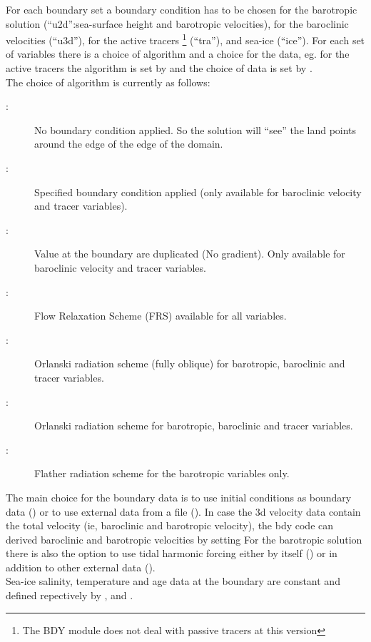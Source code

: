 \documentclass[../main/NEMO_manual]{subfiles}
\begin{document}
For each boundary set a boundary condition has to be chosen for the barotropic solution
(``u2d'':sea-surface height and barotropic velocities), for the baroclinic velocities (``u3d''), 
for the active tracers \footnote{The BDY module does not deal with passive tracers at this version} (``tra''), and sea-ice (``ice'').
For each set of variables there is a choice of algorithm and a choice for the data,
eg. for the active tracers the algorithm is set by  and the choice of data is set by .\\ 

The choice of algorithm is currently as follows:

\begin{description}
\item[:] No boundary condition applied.
  So the solution will ``see'' the land points around the edge of the edge of the domain.
\item[:] Specified boundary condition applied (only available for baroclinic velocity and tracer variables).
\item[:] Value at the boundary are duplicated (No gradient). Only available for baroclinic velocity and tracer variables.
\item[:] Flow Relaxation Scheme (FRS) available for all variables.
\item[:] Orlanski radiation scheme (fully oblique) for barotropic, baroclinic and tracer variables. 
\item[:] Orlanski radiation scheme for barotropic, baroclinic and tracer variables. 
\item[:] Flather radiation scheme for the barotropic variables only.
\end{description}

The main choice for the boundary data is to use initial conditions as boundary data
() or to use external data from a file ().
In case the 3d velocity data contain the total velocity (ie, baroclinic and barotropic velocity), 
the bdy code can derived baroclinic and barotropic velocities by setting 
For the barotropic solution there is also the option to use tidal harmonic forcing either by
itself () or in addition to other external data ().\\
Sea-ice salinity, temperature and age data at the boundary are constant and defined repectively by ,  and . 
\end{document}
